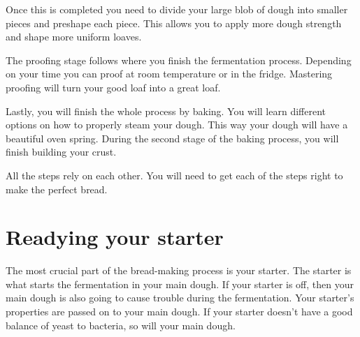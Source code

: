 Once this is completed you need to divide your large blob of
dough into smaller pieces and preshape each piece. This allows
you to apply more dough strength and shape more uniform loaves.

The proofing stage follows where you finish the fermentation process.
Depending on your time you can proof at room temperature or in the fridge.
Mastering proofing will turn your good loaf into a great loaf.

Lastly, you will finish the whole process by baking. You will learn different
options on how to properly steam your dough. This way your
dough will have a beautiful oven spring. During the second
stage of the baking process, you will finish building your crust.

All the steps rely on each other. You will need to get each of
the steps right to make the perfect bread.

\section{Readying your starter}

The most crucial part of the bread-making process is your starter.
The starter is what starts the fermentation in your main dough.
If your starter is off, then your main dough is also going
to cause trouble during the fermentation. Your starter's
properties are passed on to your main dough. If your starter
doesn't have a good balance of yeast to bacteria, so will your
main dough.

